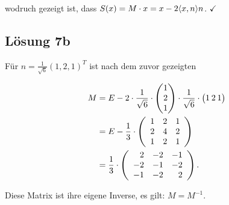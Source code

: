\documentclass[main.tex]{subfiles}
\begin{document}
wodruch gezeigt ist, dass $S(x) = M\cdot x = x-2 \langle x,n\rangle n$. $\checkmark$


\subsection*{Lösung 7b}

Für $n = \frac{1}{\sqrt{6}} (1, 2, 1)^T$ ist nach dem zuvor gezeigten

\begin{align*}
    M &= E -2 \cdot \frac{1}{\sqrt{6}}\cdot \vektor{1 \\ 2 \\ 1} \cdot \frac{1}{\sqrt{6}}\cdot \vektor{1 & 2 & 1} \\
      &= E - \frac{1}{3} \cdot \eqmatrix{rrr}{
        1 & 2 & 1 \\
        2 & 4 & 2 \\
        1 & 2 & 1} \\
      &= \frac{1}{3} \cdot \eqmatrix{rrr}{
        2 & -2 & -1 \\
        -2 & -1 & -2 \\
        -1 & -2 & 2}.
\end{align*}

Diese Matrix ist ihre eigene Inverse, es gilt: $M = M^{-1}$. 
\end{document}
